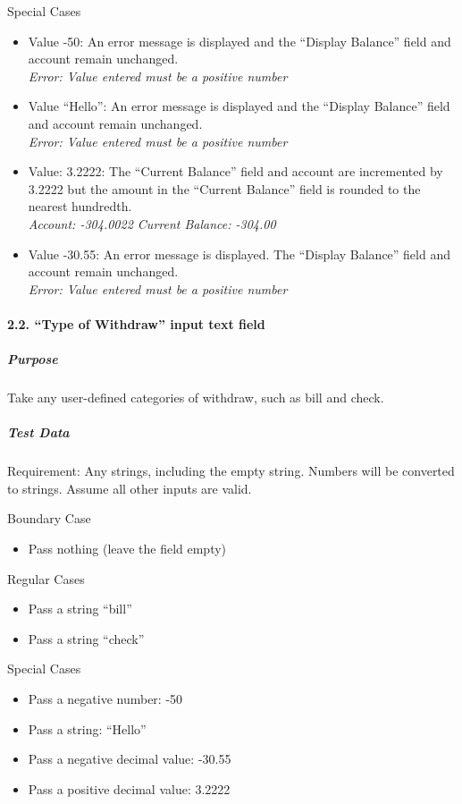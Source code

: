 \documentclass[12pt]{article}
\begin{document}
Special Cases
\begin{itemize}
  \item Value -50: An error message is displayed and the ``Display Balance'' field and account remain unchanged.\\
{\it Error: Value entered must be a positive number}
  \item Value ``Hello'': An error message is displayed and the ``Display Balance'' field and account remain unchanged.\\
{\it Error: Value entered must be a positive number}
  \item Value: 3.2222: The ``Current Balance'' field and account are incremented by 3.2222 but the amount in the ``Current Balance'' field is rounded to the nearest hundredth.\\
{\it Account: -304.0022 Current Balance: -304.00}
  \item Value -30.55: An error message is displayed. The ``Display Balance'' field and account remain unchanged.\\
{\it Error: Value entered must be a positive number}
\end{itemize}

\paragraph{2.2. ``Type of Withdraw'' input text field}
\subparagraph{Purpose} Take any user-defined categories of withdraw, such as bill and check.

\subparagraph{Test Data} Requirement: Any strings, including the empty string. Numbers will be converted to strings. Assume all other inputs are valid.

Boundary Case
\begin{itemize}
  \item Pass nothing (leave the field empty)
\end{itemize}

Regular Cases
\begin{itemize}
  \item Pass a string ``bill''
  \item Pass a string ``check''
\end{itemize}

Special Cases
\begin{itemize}
  \item Pass a negative number: -50
  \item Pass a string: ``Hello''
  \item Pass a negative decimal value: -30.55
  \item Pass a positive decimal value: 3.2222
\end{itemize}
\end{document}
